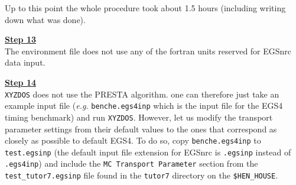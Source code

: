 
Up to this point the whole procedure took about 1.5 hours (including
writing down what was done).

\noindent
\underline{\bf Step 13} \hfill \\
The environment file does not use any of the fortran units 
reserved for EGSnrc data input.

\noindent
\underline{\bf Step 14} \hfill \\
{\tt XYZDOS} does not use the PRESTA algorithm. one can therefore 
just take an example input file ({\em e.g.} {\tt benche.egs4inp} 
which is the input file for the EGS4 timing benchmark) and 
run {\tt XYZDOS}. However, let us modify the transport 
parameter settings from their default values to the ones 
that correspond as closely as possible to default EGS4. To do so, 
copy {\tt benche.egs4inp} to {\tt test.egsinp} (the default 
input file extension for EGSnrc is {\tt .egsinp} instead 
of {\tt .egs4inp}) and include the {\tt MC Transport Parameter} 
section from the {\tt test\_tutor7.egsinp} file found in 
the {\tt tutor7} directory on the {\tt \$HEN\_HOUSE}. 

